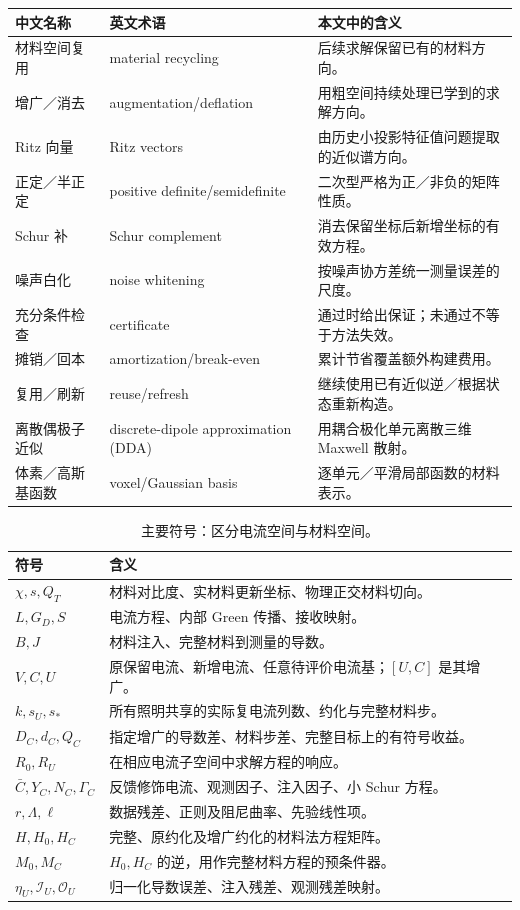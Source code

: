 \noindent\begin{tabular}{p{.23\linewidth}p{.32\linewidth}p{.36\linewidth}}
\toprule 中文名称 & 英文术语 & 本文中的含义\\\midrule
材料空间复用 & material recycling & 后续求解保留已有的材料方向。\\
增广／消去 & augmentation/deflation & 用粗空间持续处理已学到的求解方向。\\
Ritz 向量 & Ritz vectors & 由历史小投影特征值问题提取的近似谱方向。\\
正定／半正定 & positive definite/semidefinite & 二次型严格为正／非负的矩阵性质。\\
Schur 补 & Schur complement & 消去保留坐标后新增坐标的有效方程。\\
噪声白化 & noise whitening & 按噪声协方差统一测量误差的尺度。\\
充分条件检查 & certificate & 通过时给出保证；未通过不等于方法失效。\\
摊销／回本 & amortization/break-even & 累计节省覆盖额外构建费用。\\
复用／刷新 & reuse/refresh & 继续使用已有近似逆／根据状态重新构造。\\
离散偶极子近似 & discrete-dipole approximation (DDA) & 用耦合极化单元离散三维 Maxwell 散射。\\
体素／高斯基函数 & voxel/Gaussian basis & 逐单元／平滑局部函数的材料表示。\\
\bottomrule
\end{tabular}
\clearpage
\begin{table}[htbp]\centering
\caption{主要符号：区分电流空间与材料空间。}\small
\begin{tabularx}{\linewidth}{lX}\toprule
符号 & 含义\\\midrule
$\chi,s,Q_T$ & 材料对比度、实材料更新坐标、物理正交材料切向。\\
$L,G_D,S$ & 电流方程、内部 Green 传播、接收映射。\\
$B,J$ & 材料注入、完整材料到测量的导数。\\
$V,C,U$ & 原保留电流、新增电流、任意待评价电流基；$[U,C]$ 是其增广。\\
$k,s_U,s_*$ & 所有照明共享的实际复电流列数、约化与完整材料步。\\
$D_C,d_C,Q_C$ & 指定增广的导数差、材料步差、完整目标上的有符号收益。\\
$R_0,R_U$ & 在相应电流子空间中求解方程的响应。\\
$\bar C,Y_C,N_C,\Gamma_C$ & 反馈修饰电流、观测因子、注入因子、小 Schur 方程。\\
$r,\Lambda,\ell$ & 数据残差、正则及阻尼曲率、先验线性项。\\
$H,H_0,H_C$ & 完整、原约化及增广约化的材料法方程矩阵。\\
$M_0,M_C$ & $H_0,H_C$ 的逆，用作完整材料方程的预条件器。\\
$\eta_U,\mathcal I_U,\mathcal O_U$ & 归一化导数误差、注入残差、观测残差映射。\\
\bottomrule\end{tabularx}
\end{table}
